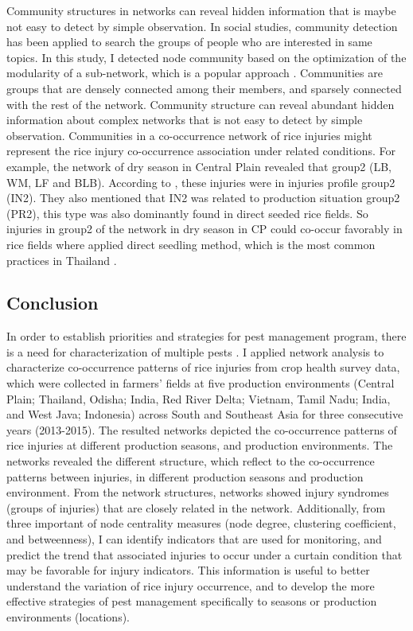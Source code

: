 Community structures in networks can reveal hidden information that is maybe not easy to detect by simple observation. In social studies, community detection has been applied to search the groups of people who are interested in same topics.   In this study, I detected node community based on the optimization of the modularity of a sub-network, which is a popular approach \citep{Liu_2014_Detecting}. Communities are groups that are densely connected among their members, and sparsely connected with the rest of the network. Community structure can reveal abundant hidden information about complex networks that is not easy to detect by simple observation. Communities in a co-occurrence network of rice injuries might represent the rice injury co-occurrence association under related conditions. For example, the network of dry season in Central Plain revealed that group2 (LB, WM, LF and BLB).  According to \citet{Savary_2000_Characterization}, these injuries were in injuries profile group2 (IN2). They also mentioned that IN2 was related to production situation group2 (PR2), this type was also dominantly found in direct seeded rice fields. So injuries in group2 of the network in dry season in CP could co-occur favorably in rice fields where applied direct seedling method, which is the most common practices in Thailand \citep{IRRI_2013_Rice}. 
\newpage
\subsection{Conclusion}

In order to establish priorities and strategies for pest management program, there is a need for characterization of multiple pests \citep{Mew_2004_Looking}. I applied network analysis to characterize co-occurrence patterns of rice injuries from crop health survey data, which were collected in farmers’ fields at five production environments (Central Plain; Thailand, Odisha; India, Red River Delta; Vietnam, Tamil Nadu; India, and West Java; Indonesia) across South and Southeast Asia for three consecutive years (2013-2015). The resulted networks depicted the co-occurrence patterns of rice injuries at different production seasons, and production environments. The networks revealed the different structure, which reflect to the co-occurrence patterns between injuries, in different production seasons and production environment. From the network structures, networks showed injury syndromes (groups of injuries) that are closely related in the network. Additionally, from three important of node centrality measures (node degree, clustering coefficient, and betweenness), I can identify indicators that are used for monitoring, and predict the trend that associated injuries to occur under a curtain condition that may be favorable for injury indicators. This information is useful to better understand the variation of rice injury occurrence, and to develop the more effective strategies of pest management specifically to seasons or production environments (locations).

